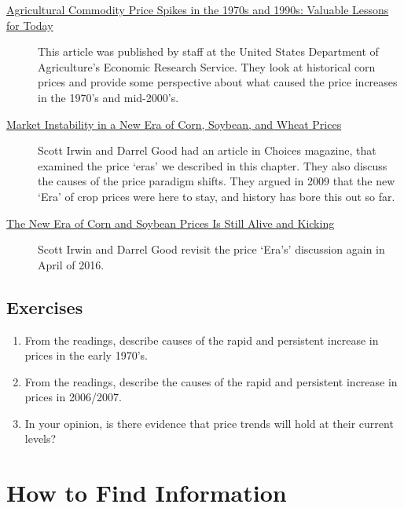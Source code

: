 \documentclass[
  letterpaper,
  DIV=11,
  numbers=noendperiod]{scrreprt}
\begin{document}
\begin{description}
\item[\href{pdf-Readings/ers-amber-waves-2009-ag-com-pr-sp-1970s-1990s.pdf}{Agricultural
Commodity Price Spikes in the 1970s and 1990s: Valuable Lessons for
Today}]
This article was published by staff at the United States Department of
Agriculture's Economic Research Service. They look at historical corn
prices and provide some perspective about what caused the price
increases in the 1970's and mid-2000's.
\item[\href{http://www.choicesmagazine.org/magazine/pdf/article_56.pdf}{Market
Instability in a New Era of Corn, Soybean, and Wheat Prices}]
Scott Irwin and Darrel Good had an article in Choices magazine, that
examined the price `eras' we described in this chapter. They also
discuss the causes of the price paradigm shifts. They argued in 2009
that the new `Era' of crop prices were here to stay, and history has
bore this out so far.
\item[\href{http://farmdocdaily.illinois.edu/2016/04/new-era-of-corn-and-soybean-prices.html}{The
New Era of Corn and Soybean Prices Is Still Alive and Kicking}]
Scott Irwin and Darrel Good revisit the price `Era's' discussion again
in April of 2016.
\end{description}

\hypertarget{exercises}{%
\section{Exercises}\label{exercises}}

\begin{enumerate}
\def\labelenumi{\arabic{enumi}.}
\item
  From the readings, describe causes of the rapid and persistent
  increase in prices in the early 1970's.
\item
  From the readings, describe the causes of the rapid and persistent
  increase in prices in 2006/2007.
\item
  In your opinion, is there evidence that price trends will hold at
  their current levels?
\end{enumerate}


\hypertarget{how-to-find-information}{%
\chapter{How to Find Information}\label{how-to-find-information}}
\end{document}
